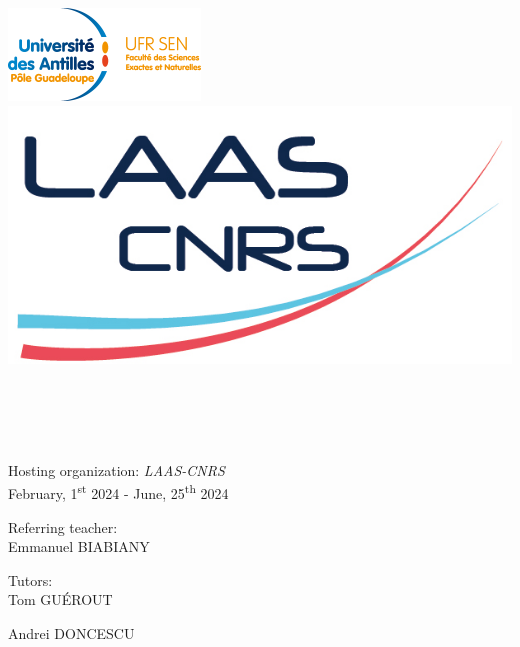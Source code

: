 \begin{titlepage}
	\begin{center}
		\includegraphics[scale=1.80]{../images/logo_ufr_sen.png}
		\hspace{2cm}
		\includegraphics[scale=1]{../images/logo-laas.jpg} \\[2cm]
		\hspace{2cm}

		\HRule \\[0.4cm]
		\@title \\[0.4cm]
		\HRule \\[1cm]

		\@author \\ [1.5cm]

		{\large Hosting organization: \textsl{LAAS-CNRS}} \\[1.5cm]

		{\large February, 1\textsuperscript{st} 2024 - June, 25\textsuperscript{th} 2024} \\[1.5cm]

		\begin{minipage}{0.7\textwidth}
			\begin{flushleft}
				Referring teacher:\\
				\hspace{0.2cm}  Emmanuel \textsc{BIABIANY}
			\end{flushleft}
		\end{minipage}

		\vspace{-0.85cm}
		\hspace{9cm}
		\begin{minipage}{0.3\textwidth}
			\begin{flushleft}
				Tutors:\\
				\hspace{0.2cm} Tom \textsc{GUÉROUT}

				\hspace{0.2cm}  Andrei \textsc{DONCESCU}
			\end{flushleft}
		\end{minipage}\\[3cm]

		\@date
	\end{center}
\end{titlepage}
